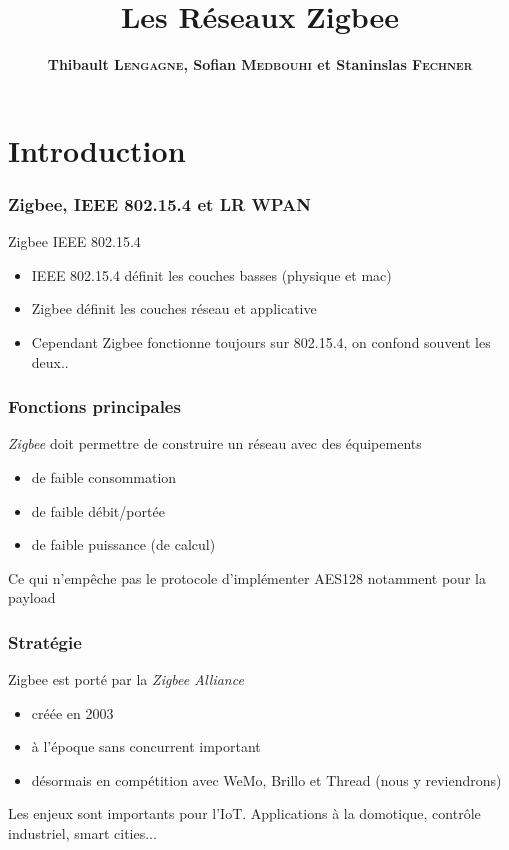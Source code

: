 \documentclass{beamer}
\title[Les Réseaux Zigbee]{Les Réseaux Zigbee}
\author{\textbf{Thibault \textsc{Lengagne}, Sofian \textsc{Medbouhi} et Staninslas \textsc{Fechner}}}
\institute{Centrale Supélec - Campus de Rennes}
\begin{document}
  \begin{frame}
    \titlepage
  \end{frame}
  

\section{Introduction}
  \begin{frame}
   \frametitle{Zigbee, IEEE 802.15.4 et LR WPAN}
   \begin{block}{Zigbee IEEE 802.15.4}
   \begin{itemize}
	   \item IEEE 802.15.4 définit les couches basses (physique et mac)
	   \item Zigbee définit les couches réseau et applicative
	   \item Cependant Zigbee fonctionne toujours sur 802.15.4, on confond souvent les deux..
   \end{itemize}
   \end{block}
  \end{frame}

\begin{frame}
   \frametitle{Fonctions principales}

   \begin{block}{\textit{Zigbee} doit permettre de construire un réseau avec des équipements}
   \begin{itemize}
    \item de faible consommation
    \item de faible débit/portée
    \item de faible puissance (de calcul)
   \end{itemize}
   Ce qui n'empêche pas le protocole d'implémenter AES128 notamment pour la payload
	\end{block}
  \end{frame}

  \begin{frame}
     \frametitle{Stratégie}
	 \begin{block}{Zigbee est porté par la \textit{Zigbee Alliance}}
	    \begin{itemize}
		    \item créée en 2003
		    \item à l'époque sans concurrent important
		    \item désormais en compétition avec WeMo, Brillo et Thread (nous y reviendrons)
	    \end{itemize}
	    Les enjeux sont importants pour l'IoT. Applications à la domotique, contrôle industriel, smart cities...
	\end{block}
  \end{frame}
\end{document}

